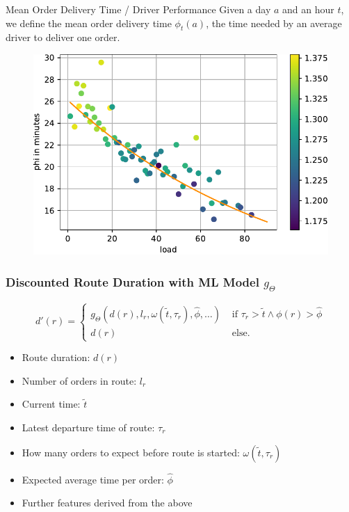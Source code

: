 \documentclass[aspectratio=1610]{beamer}
\newcommand{\important}[1]{{\color{green!60!black}#1}}
\begin{document}
\begin{frame}{Mean Order Delivery Time / Driver Performance}%
	Given a day $a$ and an hour $t$, we define the \important{mean order delivery time} $\phi_t(a)$, the time needed by an average driver to deliver one order.
	\bigskip

	\begin{figure}[tb]
		\centering
		\includegraphics[width=.80\columnwidth]{graphics/phi_fit}
	\end{figure}
\end{frame}

\begin{frame}
	\frametitle{Discounted Route Duration with ML Model $g_\Theta$}
	\begin{equation}
		d'(r) = \begin{cases}
			g_\Theta (d(r), l_r, \omega(\tilde t, \tau_r),\hat\phi,\ldots) & \mbox{ if } \tau_r>\tilde t \land \phi(r)>\hat\phi \\
			d(r) & \mbox{ else}.
		\end{cases}
		\label{eq:d_prime}
	\end{equation}

	\bigskip
	\medskip
	\begin{itemize}
		\itemsep1ex
		\item {Route duration:} $d(r)$
		\item {Number of orders in route:} $l_r$
		\item {Current time:} $\tilde t$
		\item {Latest departure time of route:} $\tau_r$
		\item {How many orders to expect before route is started:} $\omega(\tilde t, \tau_r)$
		\item {Expected average time per order:} $\hat \phi$
		\item {Further features derived from the above}
	\end{itemize}
\end{frame}
\end{document}
